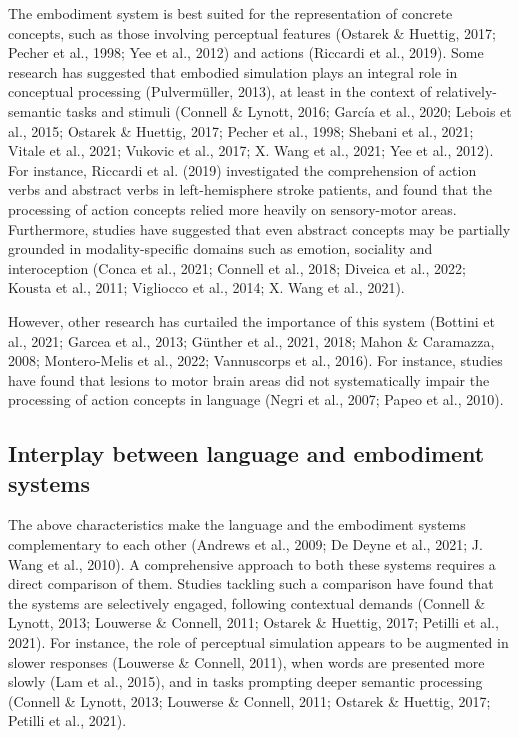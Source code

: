 \documentclass[
  12pt,
  man,floatsintext]{apa7}
\begin{document}
The embodiment system is best suited for the representation of concrete concepts, such as those involving perceptual features (Ostarek \& Huettig, 2017; Pecher et al., 1998; Yee et al., 2012) and actions (Riccardi et al., 2019). Some research has suggested that embodied simulation plays an integral role in conceptual processing (Pulvermüller, 2013), at least in the context of relatively-semantic tasks and stimuli (Connell \& Lynott, 2016; García et al., 2020; Lebois et al., 2015; Ostarek \& Huettig, 2017; Pecher et al., 1998; Shebani et al., 2021; Vitale et al., 2021; Vukovic et al., 2017; X. Wang et al., 2021; Yee et al., 2012). For instance, Riccardi et al. (2019) investigated the comprehension of action verbs and abstract verbs in left-hemisphere stroke patients, and found that the processing of action concepts relied more heavily on sensory-motor areas. Furthermore, studies have suggested that even abstract concepts may be partially grounded in modality-specific domains such as emotion, sociality and interoception (Conca et al., 2021; Connell et al., 2018; Diveica et al., 2022; Kousta et al., 2011; Vigliocco et al., 2014; X. Wang et al., 2021).

However, other research has curtailed the importance of this system (Bottini et al., 2021; Garcea et al., 2013; Günther et al., 2021, 2018; Mahon \& Caramazza, 2008; Montero-Melis et al., 2022; Vannuscorps et al., 2016). For instance, studies have found that lesions to motor brain areas did not systematically impair the processing of action concepts in language (Negri et al., 2007; Papeo et al., 2010).

\hypertarget{interplay-between-language-and-embodiment-systems}{%
\subsection{Interplay between language and embodiment systems}\label{interplay-between-language-and-embodiment-systems}}

The above characteristics make the language and the embodiment systems complementary to each other (Andrews et al., 2009; De Deyne et al., 2021; J. Wang et al., 2010). A comprehensive approach to both these systems requires a direct comparison of them. Studies tackling such a comparison have found that the systems are selectively engaged, following contextual demands (Connell \& Lynott, 2013; Louwerse \& Connell, 2011; Ostarek \& Huettig, 2017; Petilli et al., 2021). For instance, the role of perceptual simulation appears to be augmented in slower responses (Louwerse \& Connell, 2011), when words are presented more slowly (Lam et al., 2015), and in tasks prompting deeper semantic processing (Connell \& Lynott, 2013; Louwerse \& Connell, 2011; Ostarek \& Huettig, 2017; Petilli et al., 2021).
\end{document}
